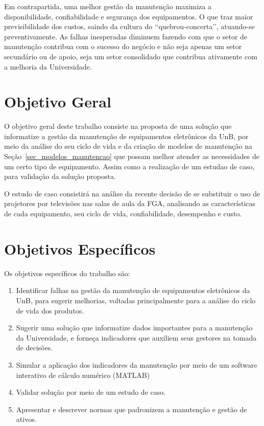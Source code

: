 Em contrapartida, uma melhor gestão da manutenção maximiza a disponibilidade, confiabilidade e segurança dos equipamentos. O que traz maior previsibilidade dos custos, saindo da cultura do \lq\lq quebrou-concerta\rq\rq, atuando-se preventivamente. As falhas inesperadas diminuem fazendo com que o setor de manutenção contribua com o sucesso do negócio e não seja apenas um setor secundário ou de apoio, seja um setor consolidado que contribua ativamente com a melhoria da Universidade.




\section{Objetivo Geral}
 
O objetivo geral deste trabalho consiste na proposta de uma solução que informatize a gestão da manutenção de equipamentos eletrônicos da UnB, por meio da análise do seu ciclo de vida e da criação de modelos de manutenção na Seção~\ref{sec_modelos_manutencao} que possam melhor atender as necessidades de um certo tipo de equipamento. Assim como a realização de um estudao de caso, para validação da solução proposta. 

O estudo de caso consistirá na análise da recente decisão de se substituir o uso de projetores por televisões nas salas de aula da FGA, analisando as características de cada equipamento, seu ciclo de vida, confiabilidade, desempenho e custo.



\section{Objetivos Específicos}

Os objetivos específicos do trabalho são:

\begin{enumerate}
	\item Identificar falhas na gestão da manutenção de equipamentos eletrônicos da UnB, para sugerir melhorias, voltadas principalmente para a análise do ciclo de vida dos produtos.
	\item Sugerir uma solução que informatize dados importantes para a manutenção da Universidade, e forneça indicadores que auxiliem seus gestores na tomada de decisões.
	\item Simular a aplicação dos indicadores da manutenção por meio de um software interativo de cálculo numérico (MATLAB) 
	\item Validar solução por meio de um estudo de caso.
	\item Apresentar e descrever normas que padronizem a manutenção e gestão de ativos.
\end{enumerate}

